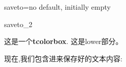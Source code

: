 \begin{docTcbKey}[][doc new=2015-05-04]{saveto}{=}{no default, initially empty}













\begin{exdispExample}{saveto_2}
\begin{tcolorbox}[saveto=\jobname_mysave2.tex]
这是一个\textbf{tcolorbox}.
\tcblower
这是lower部分。
\end{tcolorbox}

现在,我们包含进来保存好的文本内容:
\begin{tcolorbox}[colframe=red,colback=red!10,
coltitle=black,colbacktitle=red!20
,sidebyside%
,title=在这里我们看到保存的内容包括lower部分]

\end{tcolorbox}
\end{exdispExample}
\end{docTcbKey}


